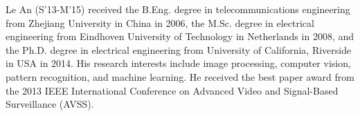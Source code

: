 \documentclass[10pt,journal,cspaper,compsoc]{IEEEtran}
\begin{document}
\begin{IEEEbiography}{Le An} (S'13-M'15) received the B.Eng. degree in telecommunications engineering from Zhejiang University in China in 2006, the M.Sc. degree in electrical engineering from Eindhoven University of Technology in Netherlands in 2008, and the Ph.D. degree in electrical engineering from University of California, Riverside in USA in 2014. His research interests include image processing, computer vision, pattern recognition, and machine learning. He received the best paper award from the 2013 IEEE International Conference on Advanced Video and Signal-Based Surveillance (AVSS).
\end{IEEEbiography}
\end{document}
